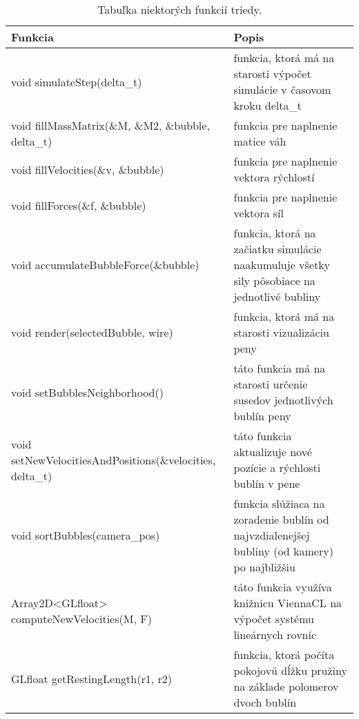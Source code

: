 \begin{table}[H]
	\centering
	\caption{Tabuľka niektorých funkcií triedy.}
	\setlength{\extrarowheight}{10pt}
	\begin{tabularx}{\textwidth}{|X|X|}
		\hline
		\textbf{Funkcia}                        & \textbf{Popis} \\ \hline
		void simulateStep(delta\_t)                     & funkcia, ktorá má na starosti výpočet simulácie v časovom kroku delta\_t \\ \hline
		void fillMassMatrix(\newline\&M, \&M2, \&bubble, delta\_t)                   & funkcia pre naplnenie matice váh \\ \hline
		void fillVelocities(\&v, \&bubble)                   & funkcia pre naplnenie vektora \newline rýchlostí \\ \hline
		void fillForces(\&f, \&bubble)                       & funkcia pre naplnenie vektora síl \\ \hline
		void \newline \mbox{accumulateBubbleForce(\&bubble)}            & funkcia, ktorá na začiatku simulácie naakumuluje všetky sily pôsobiace na jednotlivé bubliny \\ \hline
		void render(selectedBubble, wire)                           & funkcia, ktorá má na starosti vizualizáciu peny \\ \hline
		void setBubblesNeighborhood()           & táto funkcia má na starosti určenie susedov jednotlivých bublín peny \\ \hline
		void \newline setNewVelocitiesAndPositions(\newline\&velocities, delta\_t)     & táto funkcia aktualizuje nové pozície a rýchlosti bublín v pene\\ \hline
		void sortBubbles(camera\_pos)                      & funkcia slúžiaca na zoradenie bublín od najvzdialenejšej bubliny (od kamery) po najbližšiu \\ \hline
		Array2D<GLfloat> \newline computeNewVelocities(M, F) & táto funkcia využíva knižnicu ViennaCL \cite{viennacl} na výpočet systému lineárnych rovníc \\ \hline
		GLfloat getRestingLength(r1, r2)              & funkcia, ktorá počíta pokojovú dĺžku pružiny na základe polomerov dvoch bublín\\ \hline
	\end{tabularx}
\end{table}

